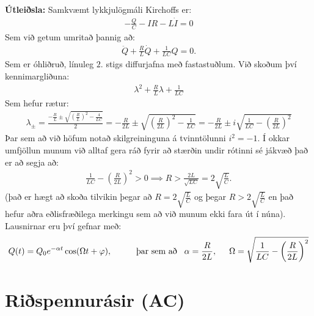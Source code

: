 \ifdefined \wholebook \else\documentclass[oneside]{book}\usepackage{EdlBook}\graphicspath{{figures/}}
\begin{document}
\textbf{Útleiðsla:} Samkvæmt lykkjulögmáli Kirchoffs er:
\begin{align*}
    -\frac{Q}{C} - IR - L\dot{I} = 0
\end{align*}
Sem við getum umritað þannig að:
\begin{align*}
    \ddot{Q} + \frac{R}{L}\dot{Q} + \frac{1}{LC}Q = 0.
\end{align*}
Sem er óhliðruð, línuleg $2.$ stigs diffurjafna með fastastuðlum. Við skoðum því kennimargliðuna:
\begin{align*}
    \lambda^2 + \frac{R}{L}\lambda + \frac{1}{LC}
\end{align*}
Sem hefur rætur:
\begin{align*}
    \lambda_\pm = \frac{-\frac{R}{L} \pm \sqrt{\left( \frac{R}{L} \right)^2 - \frac{4}{LC}}}{2} = -\frac{R}{2L} \pm \sqrt{\left( \frac{R}{2L} \right)^2 - \frac{1}{LC}} = -\frac{R}{2L} \pm i \sqrt{\frac{1}{LC} - \left(\frac{R}{2L}\right)^2}
\end{align*}
Þar sem að við höfum notað skilgreininguna á tvinntölunni $i^2 = -1$. Í okkar umfjöllun munum við alltaf gera ráð fyrir að stærðin undir rótinni sé jákvæð það er að segja að:
\begin{align*}
    \frac{1}{LC} - \left(\frac{R}{2L}\right)^2 > 0 \implies R >  \frac{2L}{\sqrt{LC}} = 2\sqrt{\frac{L}{C}}.
\end{align*}
(það er hægt að skoða tilvikin þegar að $R = 2\sqrt{\frac{L}{C}}$ og þegar $R > 2\sqrt{\frac{L}{C}}$ en það hefur aðra eðlisfræðilega merkingu sem að við munum ekki fara út í núna). Lausnirnar eru því gefnar með:
\begin{align*}
    Q(t) = Q_0 e^{-\alpha t} \cos( \Omega t + \varphi), \hspace{1cm} \text{þar sem að} \hspace{0.3cm} \alpha = \frac{R}{2L}, \hspace{0.5cm} \Omega = \sqrt{\frac{1}{LC} - \left( \frac{R}{2L} \right)^2}
\end{align*}


\section{Riðspennurásir (AC)}
\end{document}
